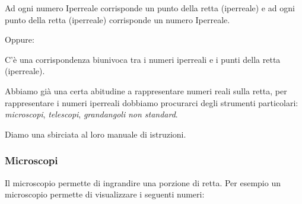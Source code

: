 \begin{postulato}
Ad ogni numero Iperreale corrisponde un punto della retta (iperreale) e ad 
ogni punto della retta (iperreale) corrisponde un numero Iperreale.
\end{postulato}

Oppure:

\begin{postulato}
C'è una corrispondenza biunivoca tra i numeri iperreali e 
i punti della retta (iperreale).
\end{postulato}

Abbiamo già una certa abitudine a rappresentare numeri reali sulla retta, 
per rappresentare i numeri iperreali dobbiamo procurarci degli strumenti 
particolari: \emph{microscopi}, \emph{telescopi}, \emph{grandangoli} 
\emph{non standard}.

Diamo una sbirciata al loro manuale di istruzioni.

\newpage %

\subsubsection{Microscopi}
\label{subsec:insnum_microscopio}

Il microscopio permette di ingrandire una porzione di retta. 
Per esempio un microscopio permette di visualizzare i seguenti numeri:

